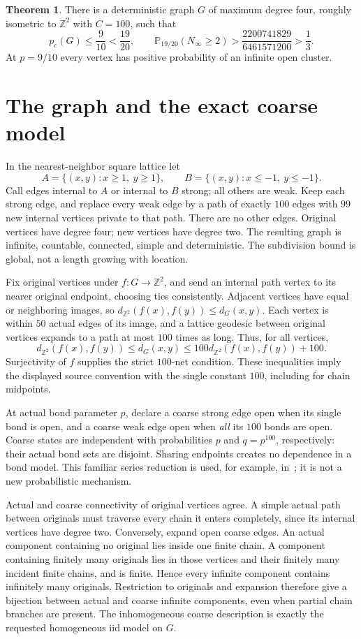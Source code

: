 \documentclass[11pt]{article}
\theoremstyle{definition}
\newtheorem{theorem}{Theorem}
\newcommand{\PP}{\mathbb P}
\newcommand{\ZZ}{\mathbb Z}
\begin{document}
\begin{theorem}\label{main}
There is a deterministic graph $G$ of maximum degree four, roughly isometric
to $\ZZ^2$ with $C=100$, such that
\[
 p_c(G)\leq\frac9{10}<\frac{19}{20},
 \qquad
 \PP_{19/20}(N_\infty\geq2)>
 \frac{2200741829}{6461571200}>\frac13 .
\]
At $p=9/10$ every vertex has positive probability of an infinite open cluster.
\end{theorem}

\section{The graph and the exact coarse model}
In the nearest-neighbor square lattice let
\[
 A=\{(x,y):x\geq1,\ y\geq1\},\qquad
 B=\{(x,y):x\leq-1,\ y\leq-1\}.
\]
Call edges internal to $A$ or internal to $B$ strong; all others are weak.
Keep each strong edge, and replace every weak edge by a path of exactly
$100$ edges with $99$ new internal vertices private to that path.
There are no other edges. Original vertices have degree four; new vertices
have degree two. The resulting graph is infinite, countable, connected,
simple and deterministic. The subdivision bound is global, not a length
growing with location.

Fix original vertices under $f:G\to\ZZ^2$, and send an internal path vertex
to its nearer original endpoint, choosing ties consistently. Adjacent
vertices have equal or neighboring images, so
$d_{\ZZ^2}(f(x),f(y))\leq d_G(x,y)$. Each vertex is within $50$ actual
edges of its image, and a lattice geodesic between original vertices expands
to a path at most $100$ times as long. Thus, for all vertices,
\[
 d_{\ZZ^2}(f(x),f(y))\leq d_G(x,y)
 \leq100d_{\ZZ^2}(f(x),f(y))+100.
\]
Surjectivity of $f$ supplies the strict $100$-net condition. These inequalities
imply the displayed source convention with the single constant $100$,
including for chain midpoints.

At actual bond parameter $p$, declare a coarse strong edge open when its
single bond is open, and a coarse weak edge open when \emph{all} its
$100$ bonds are open. Coarse states are independent with probabilities
$p$ and $q=p^{100}$, respectively: their actual bond sets are disjoint.
Sharing endpoints creates no dependence in a bond model. This familiar
series reduction is used, for example, in~\cite[Section 2]{hsst};
it is not a new probabilistic mechanism.

Actual and coarse connectivity of original vertices agree. A simple actual
path between originals must traverse every chain it enters completely,
since its internal vertices have degree two. Conversely, expand open
coarse edges. An actual component containing no original lies inside one
finite chain. A component containing finitely many originals lies in
those vertices and their finitely many incident finite chains, and is
finite. Hence every infinite component contains infinitely many originals.
Restriction to originals and expansion therefore give a bijection between
actual and coarse infinite components, even when partial chain branches
are present. The inhomogeneous coarse description is exactly the requested
homogeneous iid model on $G$.
\end{document}
